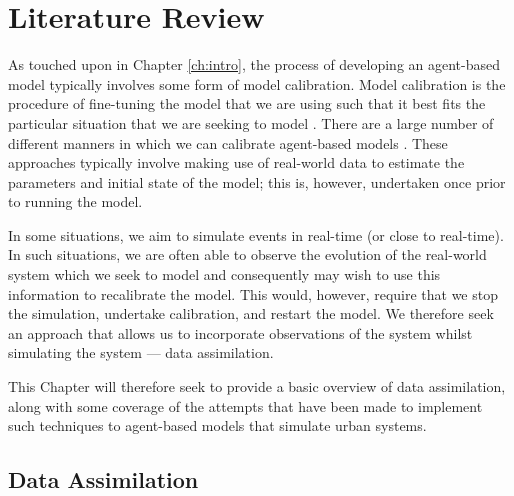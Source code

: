 \chapter{Literature Review}\label{ch:lit_rev}


As touched upon in Chapter \ref{ch:intro}, the process of developing an
agent-based model typically involves some form of model calibration.
Model calibration is the procedure of fine-tuning the model that we are using
such that it best fits the particular situation that we are seeking to model
\citep{crooks2012introduction}.
There are a large number of different manners in which we can calibrate
agent-based models \citep{thiele2014facilitating}.
These approaches typically involve making use of real-world data to estimate the
parameters and initial state of the model; this is, however, undertaken once
prior to running the model.

In some situations, we aim to simulate events in real-time (or close to
real-time).
In such situations, we are often able to observe the evolution of
the real-world system which we seek to model and consequently may wish to use
this information to recalibrate the model.
This would, however, require that we stop the simulation, undertake calibration,
and restart the model.
We therefore seek an approach that allows us to incorporate observations of the
system whilst simulating the system --- data assimilation.

This Chapter will therefore seek to provide a basic overview of data
assimilation, along with some coverage of the attempts that have been made to
implement such techniques to agent-based models that simulate urban systems.

\section{Data Assimilation}\label{sec:lit_rev:da}


